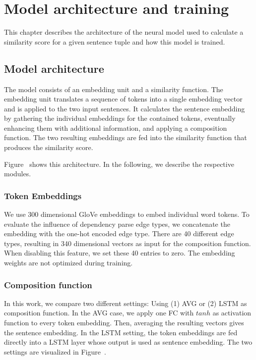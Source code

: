 \section{Model architecture and training}
This chapter describes the architecture of the neural model used to calculate a similarity score for a given sentence tuple and how this model is trained.

\subsection{Model architecture}
The model consists of an embedding unit and a similarity function. The embedding unit translates a sequence of tokens into a single embedding vector and is applied to the two input sentences. It calculates the sentence embedding by gathering the individual embeddings for the contained tokens, eventually enhancing them with additional information, and applying a composition function. The two resulting embeddings are fed into the similarity function that produces the similarity score. 

Figure~ shows this architecture. In the following, we describe the respective modules. 

\subsubsection{Token Embeddings}
We use 300 dimensional GloVe embeddings  \autocite{pennington_glove:_2014} to embed individual word tokens. To evaluate the influence of dependency parse edge types, we concatenate the embedding with the one-hot encoded edge type. There are 40 different edge types, resulting in 340 dimensional vectors as input for the composition function. When disabling this feature, we set these 40 entries to zero. The embedding weights are not optimized during training.   

\subsubsection{Composition function}
In this work, we compare two different settings: Using (1) \acf{AVG} or (2) \acf{LSTM} as composition function. 
In the \ac{AVG} case, we apply one \acf{FC} with $tanh$ as activation function to every token embedding. Then, averaging the resulting vectors gives the sentence embedding.
In the \ac{LSTM} setting, the token embeddings are fed directly into a LSTM layer whose output is used as sentence embedding. The two settings are visualized in Figure~.

